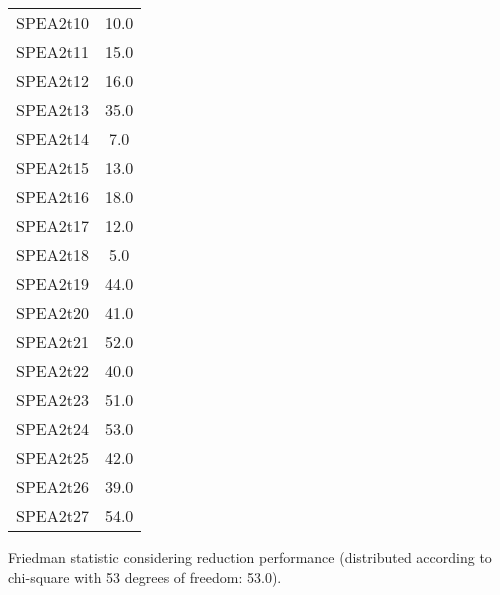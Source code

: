 \documentclass{article}
\begin{document}
\begin{table}[!htp]
\begin{tabular}{c|c}
SPEA2t10&10.0\\
SPEA2t11&15.0\\
SPEA2t12&16.0\\
SPEA2t13&35.0\\
SPEA2t14&7.0\\
SPEA2t15&13.0\\
SPEA2t16&18.0\\
SPEA2t17&12.0\\
SPEA2t18&5.0\\
SPEA2t19&44.0\\
SPEA2t20&41.0\\
SPEA2t21&52.0\\
SPEA2t22&40.0\\
SPEA2t23&51.0\\
SPEA2t24&53.0\\
SPEA2t25&42.0\\
SPEA2t26&39.0\\
SPEA2t27&54.0\\
\end{tabular}
\end{table}


Friedman statistic considering reduction performance (distributed according to chi-square with 53 degrees of freedom: 53.0).
\end{document}
